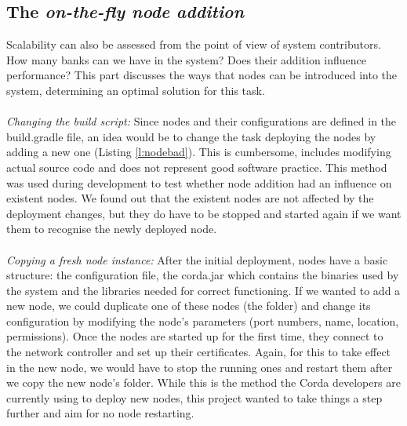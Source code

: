 \documentclass[12pt,twoside]{article}
\begin{document}
\subsection{The \textit{on-the-fly node addition}}
\label{sub:flynode}
Scalability can also be assessed from the point of view of system contributors. How many banks can we have in the system? Does their addition influence performance? This part discusses the ways that nodes can be introduced into the system, determining an optimal solution for this task.
\\ \\
\textit{Changing the build script:} Since nodes and their configurations are defined in the build.gradle file, an idea would be to change the task deploying the nodes by adding a new one (Listing \ref{l:nodebad}). This is cumbersome, includes modifying actual source code and does not represent good software practice. This method was used during development to test whether node addition had an influence on existent nodes. We found out that the existent nodes are not affected by the deployment changes, but they do have to be stopped and started again if we want them to recognise the newly deployed node.
\\ \\
\textit{Copying a fresh node instance:} After the initial deployment, nodes have a basic structure: the configuration file, the corda.jar which contains the binaries used by the system and the libraries needed for correct functioning. If we wanted to add a new node, we could duplicate one of these nodes (the folder) and change its configuration by modifying the node's parameters (port numbers, name, location, permissions). Once the nodes are started up for the first time, they connect to the network controller and set up their certificates. Again, for this to take effect in the new node, we would have to stop the running ones and restart them after we copy the new node's folder. While this is the method the Corda developers are currently using to deploy new nodes, this project wanted to take things a step further and aim for no node restarting.
\\ \\
\end{document}
